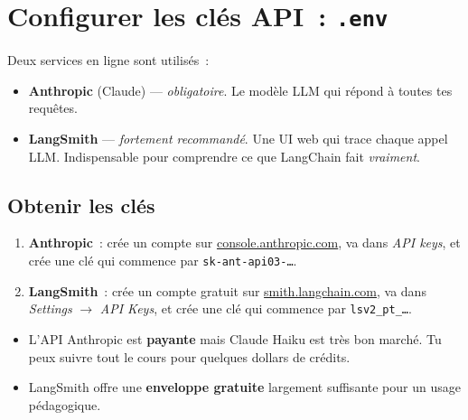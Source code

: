 \documentclass[11pt,a4paper]{article}
\begin{document}
\section{Configurer les clés API~: \texttt{.env}}

Deux services en ligne sont utilisés~:

\begin{itemize}[leftmargin=*]
  \item \textbf{Anthropic} (Claude) — \emph{obligatoire}. Le modèle
        LLM qui répond à toutes tes requêtes.
  \item \textbf{LangSmith} — \emph{fortement recommandé}. Une UI
        web qui trace chaque appel LLM. Indispensable pour
        comprendre ce que LangChain fait \emph{vraiment}.
\end{itemize}

\subsection{Obtenir les clés}

\begin{enumerate}[leftmargin=*]
  \item \textbf{Anthropic}~: crée un compte sur
        \href{https://console.anthropic.com}{console.anthropic.com},
        va dans \textit{API keys}, et crée une clé qui commence par
        \texttt{sk-ant-api03-\dots}.
  \item \textbf{LangSmith}~: crée un compte gratuit sur
        \href{https://smith.langchain.com}{smith.langchain.com},
        va dans \textit{Settings} $\to$ \textit{API Keys}, et crée
        une clé qui commence par \texttt{lsv2\_pt\_\dots}.
\end{enumerate}

\begin{tcolorbox}[title=Avertissement crédits / coûts]
\begin{itemize}[leftmargin=*]
  \item L'API Anthropic est \textbf{payante} mais Claude Haiku est
        très bon marché. Tu peux suivre tout le cours pour quelques
        dollars de crédits.
  \item LangSmith offre une \textbf{enveloppe gratuite} largement
        suffisante pour un usage pédagogique.
\end{itemize}
\end{tcolorbox}
\end{document}
